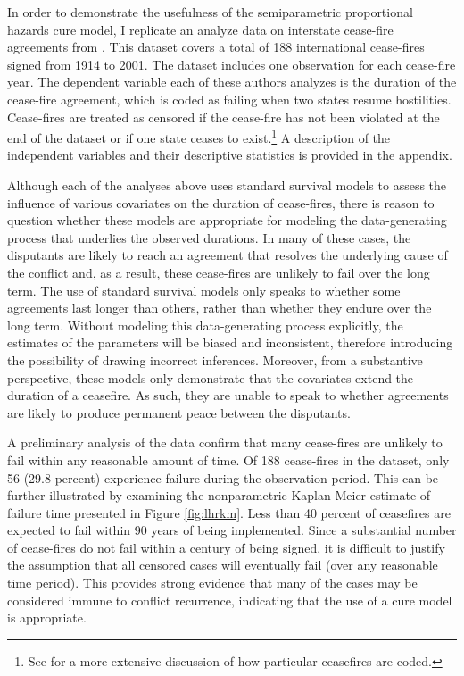 \documentclass{article}
\begin{document}
In order to demonstrate the usefulness of the semiparametric proportional hazards cure model, I replicate an analyze data on interstate cease-fire agreements from \citet{fortna2004b, lo2008, werner2005}. This dataset covers a total of 188 international cease-fires signed from 1914 to 2001. The dataset includes one observation for each cease-fire year. The dependent variable each of these authors analyzes is the duration of the cease-fire agreement, which is coded as failing when two states resume hostilities. Cease-fires are treated as censored if the cease-fire has not been violated at the end of the dataset or if one state ceases to exist.\footnote{See \citet{fortna2004b, lo2008} for a more extensive discussion of how particular ceasefires are coded.} A description of the independent variables and their descriptive statistics is provided in the appendix.

Although each of the analyses above uses standard survival models to assess the influence of various covariates on the duration of cease-fires, there is reason to question whether these models are appropriate for modeling the data-generating process that underlies the observed durations. In many of these cases, the disputants are likely to reach an agreement that resolves the underlying cause of the conflict and, as a result, these cease-fires are unlikely to fail over the long term. The use of standard survival models only speaks to whether some agreements last longer than others, rather than whether they endure over the long term. Without modeling this data-generating process explicitly, the estimates of the parameters will be biased and inconsistent, therefore introducing the possibility of drawing incorrect inferences. Moreover, from a substantive perspective, these models only demonstrate that the covariates extend the duration of a ceasefire. As such, they are unable to speak to whether agreements are likely to produce permanent peace between the disputants.



A preliminary analysis of the data confirm that many cease-fires are unlikely to fail within any reasonable amount of time. Of 188 cease-fires in the dataset, only 56 (29.8 percent) experience failure during the observation period. This can be further illustrated by examining the nonparametric Kaplan-Meier estimate of failure time presented in Figure \ref{fig:lhrkm}. Less than 40 percent of ceasefires are expected to fail within 90 years of being implemented. Since a substantial number of cease-fires do not fail within a century of being signed, it is difficult to justify the assumption that all censored cases will eventually fail (over any reasonable time period). This provides strong evidence that many of the cases may be considered immune to conflict recurrence, indicating that the use of a cure model is appropriate. 
\end{document}
